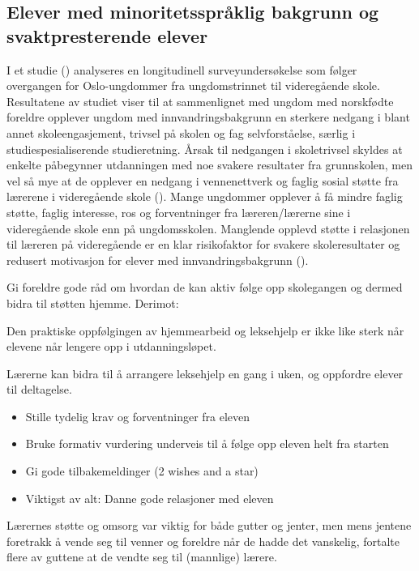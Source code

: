 \documentclass[main.tex]{subfiles}
\begin{document}
\subsection*{Elever med minoritetsspråklig bakgrunn og svaktpresterende elever}
I et studie () analyseres en longitudinell surveyundersøkelse som følger overgangen for Oslo-ungdommer fra ungdomstrinnet til videregående skole. Resultatene av studiet viser til at sammenlignet med ungdom med norskfødte foreldre opplever ungdom med innvandringsbakgrunn en sterkere nedgang i blant annet skoleengasjement, trivsel på skolen og fag selvforståelse, særlig i studiespesialiserende studieretning. Årsak til nedgangen i skoletrivsel skyldes at enkelte påbegynner utdanningen med noe svakere resultater fra grunnskolen, men vel så mye at de opplever en nedgang i vennenettverk og faglig sosial støtte fra lærerene i videregående skole (). Mange ungdommer opplever å få mindre faglig støtte, faglig interesse, ros og forventninger fra læreren/lærerne sine i videregående skole enn på ungdomsskolen. Manglende opplevd støtte i relasjonen til læreren på videregående er en klar risikofaktor for svakere skoleresultater og redusert motivasjon for elever med innvandringsbakgrunn ().

Gi foreldre gode råd om hvordan de kan aktiv følge opp skolegangen og dermed bidra til støtten hjemme.
Derimot:
\begin{displayquote}
Den praktiske oppfølgingen av hjemmearbeid og leksehjelp er ikke like sterk når elevene når lengere opp i utdanningsløpet.
\end{displayquote}
Lærerne kan bidra til å arrangere leksehjelp en gang i uken, og oppfordre elever til deltagelse.
\begin{itemize}
\item Stille tydelig krav og forventninger fra eleven
\item Bruke formativ vurdering underveis til å følge opp eleven helt fra starten
\item Gi gode tilbakemeldinger (2 wishes and a star)
\item Viktigst av alt: Danne gode relasjoner med eleven
\end{itemize}
\begin{displayquote}
Lærernes støtte og omsorg var viktig for både gutter og jenter, men mens jentene foretrakk å vende seg til venner og foreldre når de hadde det vanskelig, fortalte flere av guttene at de vendte seg til (mannlige) lærere.
\end{displayquote}
\end{document}
